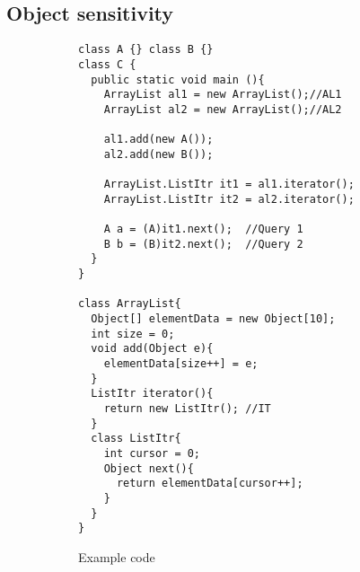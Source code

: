 \subsection{Object sensitivity}
%
\begin{figure}
\begin{subfigure}[b]{.9\columnwidth}
\begin{multicols}{2}
\centering
\begin{lstlisting}
class A {} class B {}
class C {
  public static void main (){
    ArrayList al1 = new ArrayList();//AL1
    ArrayList al2 = new ArrayList();//AL2

    al1.add(new A());
    al2.add(new B());

    ArrayList.ListItr it1 = al1.iterator();
    ArrayList.ListItr it2 = al2.iterator();

    A a = (A)it1.next();  //Query 1
    B b = (B)it2.next();  //Query 2
  }
}

class ArrayList{
  Object[] elementData = new Object[10];
  int size = 0;
  void add(Object e){
    elementData[size++] = e;
  }
  ListItr iterator(){
    return new ListItr(); //IT
  }
  class ListItr{
    int cursor = 0;
    Object next(){
      return elementData[cursor++];
    }
  }
}
\end{lstlisting}
\end{multicols}
\caption{Example code}
\label{fig:obj:code}
\end{subfigure}
\begin{multicols}{2}
\begin{subfigure}[b]{.9\columnwidth}
\begin{center}
\end{center}
\end{subfigure}
\end{multicols}
\end{figure}
